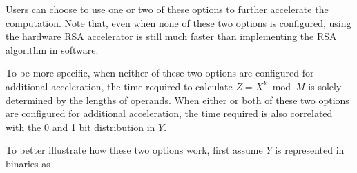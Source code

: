 \documentclass[main\_\_EN.tex]{subfiles}
\begin{document}
Users can choose to use one or two of these options to further accelerate the computation. Note that, even when none of these two options is configured, using the hardware RSA accelerator is still much faster than implementing the RSA algorithm in software.

To be more specific, when neither of these two options are configured for additional acceleration, the time required to calculate \begin{math}Z = X^{Y} \bmod M\end{math} is solely determined by the lengths of operands.  When either or both of these two options are configured for additional acceleration, the time required is also correlated with the 0 and 1 bit distribution in \begin{math}Y\end{math}.

To better illustrate how these two options work, first assume \begin{math}Y \end{math} is represented in binaries as
\end{document}
